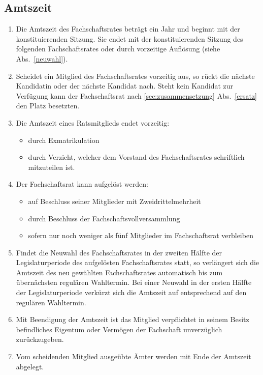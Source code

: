 \subsection{Amtszeit}
\begin{enumerate}
	\item Die Amtszeit des Fachschaftsrates beträgt ein Jahr und beginnt mit der konstituierenden Sitzung. Sie endet mit der konstituierenden Sitzung des folgenden Fachschaftsrates oder durch vorzeitige Auflösung (siehe Abs.~\ref{neuwahl}).
	\item Scheidet ein Mitglied des Fachschaftsrates vorzeitig aus, so rückt die nächste Kandidatin  oder der nächste Kandidat nach. Steht kein Kandidat zur Verfügung kann der Fachschaftsrat nach \ref{sec:zusammensetzung} Abs.~\ref{ersatz} den Platz besetzten.
	\item Die Amtszeit eines Ratsmitglieds endet vorzeitig:
	\begin{itemize}
		\item durch Exmatrikulation
		\item durch Verzicht, welcher dem Vorstand des Fachschaftsrates schriftlich mitzuteilen ist.
	\end{itemize}
	\item Der Fachschaftsrat kann aufgelöst werden:
	\begin{itemize}
		\item auf Beschluss seiner Mitglieder mit Zweidrittelmehrheit
		\item durch Beschluss der Fachschaftsvollversammlung
		\item sofern nur noch weniger als fünf Mitglieder im Fachschaftsrat verbleiben
	\end{itemize}
	\item \label{neuwahl} Findet die Neuwahl des Fachschaftsrates in der zweiten Hälfte der Legislaturperiode des aufgelösten Fachschaftsrates statt, so verlängert sich die Amtszeit des neu gewählten Fachschaftsrates automatisch bis zum übernächsten regulären Wahltermin. Bei einer Neuwahl in der ersten Hälfte der Legislaturperiode verkürzt sich die Amtszeit auf entsprechend auf den regulären Wahltermin.
	\item Mit Beendigung der Amtszeit ist das Mitglied verpflichtet in seinem Besitz befindliches Eigentum oder Vermögen der Fachschaft unverzüglich zurückzugeben.
	\item Vom scheidenden Mitglied ausgeübte Ämter werden mit Ende der Amtszeit abgelegt.
\end{enumerate}

